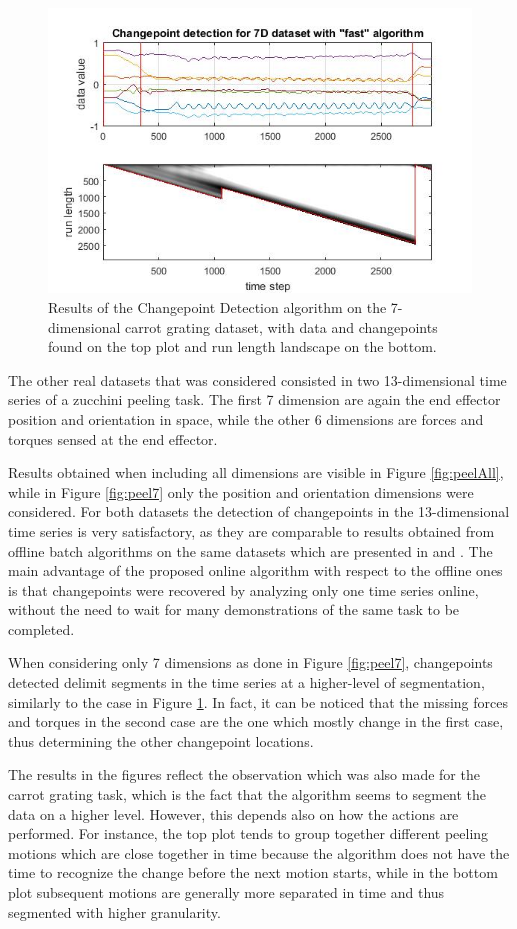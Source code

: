 \documentclass[11pt,twoside,a4paper]{report}
\begin{document}
\begin{figure} [h]
\centering
\includegraphics[width=.7\textwidth]{carrot_fast.jpg}
\caption{Results of the Changepoint Detection algorithm on the 7-dimensional carrot grating dataset, with data and changepoints found on the top plot and run length landscape on the bottom.}
\label{fig:carrot}
\end{figure}

The other real datasets that was considered consisted in two 13-dimensional time series of a zucchini peeling task. The first 7 dimension are again the end effector position and orientation in space, while the other 6 dimensions are forces and torques sensed at the end effector.

Results obtained when including all dimensions are visible in Figure \ref{fig:peelAll}, while in Figure \ref{fig:peel7} only the position and orientation dimensions were considered. For both datasets the detection of changepoints in the 13-dimensional time series is very satisfactory, as they are comparable to results obtained from offline batch algorithms on the same datasets which are presented in \cite{lucia} and \cite{nadia}. The main advantage of the proposed online algorithm with respect to the offline ones is that changepoints were recovered by analyzing only one time series online, without the need to wait for many demonstrations of the same task to be completed.

When considering only 7 dimensions as done in Figure \ref{fig:peel7}, changepoints detected delimit segments in the time series at a higher-level of segmentation, similarly to the case in Figure \ref{fig:carrot}. In fact, it can be noticed that the missing forces and torques in the second case are the one which mostly change in the first case, thus determining the other changepoint locations.

The results in the figures reflect the observation which was also made for the carrot grating task, which is the fact that the algorithm seems to segment the data on a higher level. However, this depends also on how the actions are performed. For instance, the top plot tends to group together different peeling motions which are close together in time because the algorithm does not have the time to recognize the change before the next motion starts, while in the bottom plot subsequent motions are generally more separated in time and thus segmented with higher granularity.
\end{document}

